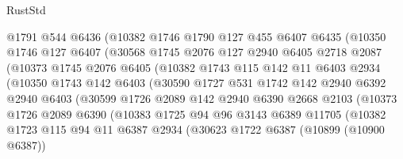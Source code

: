 \begin{lexlean}{RustStd}
\begin{coremodule}
                @1791
                @544
                @6436
                (@10382
                  @1746
                  @1790
                  @127
                  @455
                  @6407
                  @6435
                  (@10350
                    @1746
                    @127
                    @6407
                    (@30568
                      @1745
                      @2076
                      @127
                      @2940
                      @6405
                      @2718
                      @2087
                      (@10373
                        @1745
                        @2076
                        @6405
                        (@10382
                          @1743
                          @115
                          @142
                          @11
                          @6403
                          @2934
                          (@10350
                            @1743
                            @142
                            @6403
                            (@30590
                              @1727
                              @531
                              @1742
                              @142
                              @2940
                              @6392
                              @2940
                              @6403
                              (@30599
                                @1726
                                @2089
                                @142
                                @2940
                                @6390
                                @2668
                                @2103
                                (@10373
                                  @1726
                                  @2089
                                  @6390
                                  (@10383
                                    @1725
                                    @94
                                    @96
                                    @3143
                                    @6389
                                    @11705
                                    (@10382
                                      @1723
                                      @115
                                      @94
                                      @11
                                      @6387
                                      @2934
                                      (@30623
                                        @1722
                                        @6387
                                        (@10899 (@10900 @6387))

\end{coremodule}
\end{lexlean}
